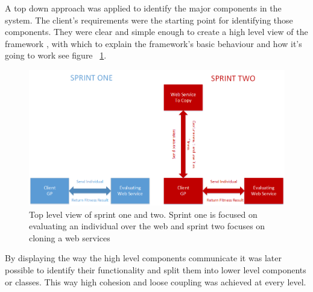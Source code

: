 A top down approach was applied to identify the major components in the system. The client's requirements were the starting point for identifying those components. They were
clear and simple enough to create a high level view of the framework , with which to explain the framework's basic behaviour and how it's going to work see figure ~\ref{fig:sprints}. 

\begin{figure}[htp]
\centering
\includegraphics[scale=0.6]{Figures/sprints.png}
\caption{Top level view of sprint one and two. Sprint one is focused on evaluating an individual over the web and sprint two focuses on cloning a web services}
\label{fig:sprints}
\end{figure}

By displaying the way the high level components communicate it was later possible to identify their functionality and split them into lower level components or classes.
This way high cohesion and loose coupling was achieved at every level.
